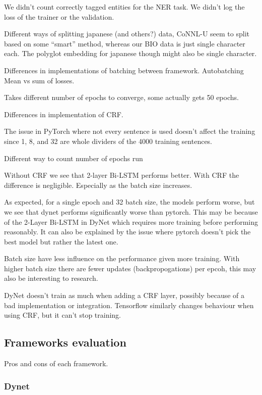We didn't count correctly tagged entities for the NER task.
We didn't log the loss of the trainer or the validation.




Different ways of splitting japanese (and others?) data, CoNNL-U seem to split
based on some ``smart'' method, whereas our BIO data is just single character
each. The polyglot embedding for japanese though might also be single character.

Differences in implementations of batching between framework. Autobatching
Mean vs sum of losses.

Takes different number of epochs to converge, some actually gets 50 epochs.

Differences in implementation of CRF.

The issue in PyTorch where not every sentence is used doesn't affect the
training since 1, 8, and 32 are whole dividers of the 4000 training sentences.

Different way to count number of epochs run

Without CRF we see that 2-layer Bi-LSTM performs better. With CRF the difference is negligible.
Especially as the batch size increases.

As expected, for a single epoch and 32 batch size, the models perform worse, 
but we see that dynet performs significantly worse than pytorch. This may be 
because of the 2-Layer Bi-LSTM in DyNet which requires more training before 
performing reasonably. It can also be explained by the issue where pytorch
doesn't pick the best model but rather the latest one.

Batch size have less influence on the performance given more training.
With higher batch size there are fewer updates (backpropogations) per epcoh,
this may also be interesting to research.

DyNet doesn't train as much when adding a CRF layer, possibly because of a bad
implementation or integration. Tensorflow similarly changes behaviour when using
CRF, but it can't stop training.

\subsection{Frameworks evaluation}
\label{subsec:frameworks}

Pros and cons of each framework.

\subsubsection{Dynet}

